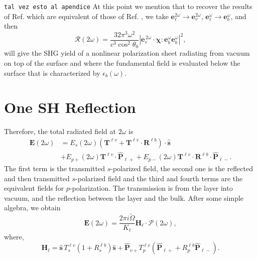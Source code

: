 \verb=tal vez esto al apendice=
At this point we mention that to recover the results of Ref.
\cite{mizrahiJOSA88} which are equivalent of those of Ref. \cite{sipePRB87}, we
take $\mathbf{e}^{2\omega}_{\ell}\to \mathbf{e}^{2\omega}_v$,
$\mathbf{e}^{\omega}_{\ell}\to \mathbf{e}^{\omega}_{b}$, 
and then
\begin{equation}\label{m69}
\mathcal{R}(2\omega) =
\frac{32\pi^{3} \omega^{2}}{c^{3}\cos^{2}\theta_{0}}
\left\vert
\mathbf{e}^{\,2\omega}_{v}\cdot\boldsymbol{\chi}:
\mathbf{e}^{\omega}_{b}\mathbf{e}^{\omega}_{b}
\right\vert^{2} 
,
\end{equation}
will give the SHG yield of a nonlinear polarization sheet radiating from vacuum
on top of the surface and where the fundamental field is evaluated below the
surface that is characterized by $\epsilon_{b}(\omega)$.


\section{One SH Reflection}
Therefore, the total radiated field at 
$2\omega$ is 
\begin{equation}\label{r7}
\begin{split}
\mathbf{E}(2\omega)  
&= E_s(2\omega)  
\left(
\mathbf{T}^{\ell v} + \mathbf{T}^{\ell v}\cdot\mathbf{R}^{\ell b}
\right)  
\cdot\hat{\mathbf{s}}\nonumber\\
&+ E_{p+}(2\omega)\mathbf{T}^{\ell v}\cdot\hat{\mathbf{P}}_{\ell +}
 + E_{p-}(2\omega)\mathbf{T}^{\ell v}
\cdot\mathbf{R}^{\ell b}\cdot\hat{\mathbf{P}}_{\ell-}.  
\end{split}
\end{equation} 
The first term is  the transmitted $s$-polarized field, the second one is the 
reflected and then transmitted $s$-polarized field and the third and fourth 
terms are the equivalent fields for $p$-polarization. The transmission is from 
the layer into vacuum, and the reflection between the layer and the bulk. After 
some simple algebra, we obtain 
\begin{equation}\label{r8}
\mathbf{E}(2\omega) = \frac{2\pi i\tilde{\Omega}}{K_{\ell}}
\mathbf{H}_{\ell}\cdot\boldsymbol{\mathcal{P}}(2\omega),
\end{equation} 
where,
\begin{equation}\label{r9}
\mathbf{H}_{\ell}
= \hat{\mathbf{s}}\,T_s^{\ell v}\left(1+R_s^{\ell b}\right)\hat{\mathbf{s}}
+ \hat{\mathbf{P}}_{v+}T_{p}^{\ell v}
\left(
\hat{\mathbf{P}}_{\ell +} +R_{p}^{\ell b}\hat{\mathbf{P}}_{\ell -}
\right). 
\end{equation}

